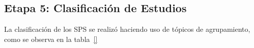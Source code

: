 \subsection{Etapa 5: Clasificación de Estudios}\label{sec:clasificacion-estudios}
La clasificación de los SPS se realizó haciendo uso de tópicos de agrupamiento, como se observa en la tabla~\ref{}